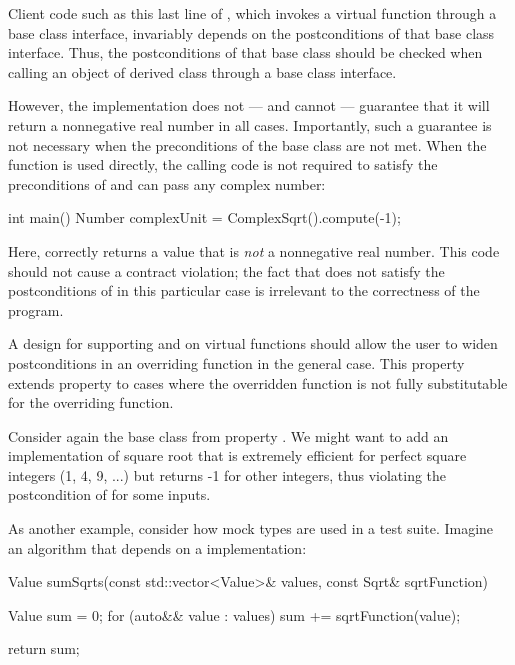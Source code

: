 Client code such as this last line of , which invokes a virtual function through a base class interface, invariably depends on the postconditions of that base class interface. Thus, the postconditions of that base class should be checked when calling an object of derived class through a base class interface.

However, the implementation  does not --- and cannot --- guarantee that it will return a nonnegative real number in all cases. Importantly, such a guarantee is not necessary when the preconditions of the base class are not met. When the function  is used directly, the calling code is not required to satisfy the preconditions of  and can pass any complex number:

\begin{codeblock}
int main() {
  Number complexUnit = ComplexSqrt().compute(-1);
}
\end{codeblock}

Here,  correctly returns a value that is \emph{not} a nonnegative real number. This code should not cause a contract violation; the fact that  does not satisfy the postconditions of  in this particular case is irrelevant to the correctness of the program.


A design for supporting  and  on virtual functions should allow the user to widen postconditions in an overriding function in the general case. This property extends property  to cases where the overridden function is not fully substitutable for the overriding function. 

Consider again the base class  from property . We might want to add an implementation of square root  that is extremely efficient for perfect square integers (1, 4, 9, ...) but returns -1 for other integers, thus violating the postcondition of  for some inputs.

As another example, consider how mock types are used in a test suite. Imagine an algorithm that depends on a  implementation:

\begin{codeblock}
Value sumSqrts(const std::vector<Value>& values, const Sqrt& sqrtFunction) {
  Value sum = 0;
  for (auto&& value : values)
    sum += sqrtFunction(value);
    
  return sum;
}
\end{codeblock}

